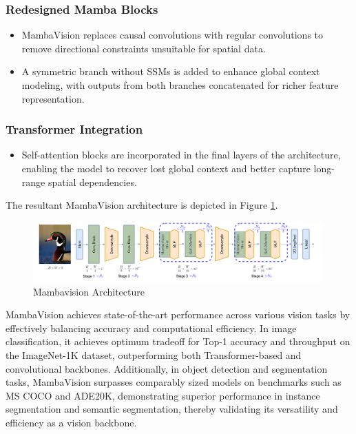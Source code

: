 \documentclass[12pt, conference, compsoc, onecolumn]{IEEEtran}
\begin{document}
	\subsubsection*{Redesigned Mamba Blocks}
	\begin{itemize}
		\item MambaVision replaces causal convolutions with regular convolutions to remove directional constraints unsuitable for spatial data.
		\item A symmetric branch without SSMs is added to enhance global context modeling, with outputs from both branches concatenated for richer feature representation.
	\end{itemize}
	
	\subsubsection*{Transformer Integration}
	\begin{itemize}
		\item Self-attention blocks are incorporated in the final layers of the architecture, enabling the model to recover lost global context and better capture long-range spatial dependencies.
	\end{itemize}
	
	
	The resultant MambaVision architecture is depicted in Figure \ref{fig:mambavision_arch}.

	\begin{figure}[H]
		\centering
		\includegraphics[width=0.99\textwidth]{figures/mambavision_arch.png}
		\caption{Mambavision Architecture\cite{hatamizadeh2024mambavision}}
		\label{fig:mambavision_arch}
	\end{figure}
	
	MambaVision achieves state-of-the-art performance across various vision tasks by effectively balancing accuracy and computational efficiency. In image classification, it achieves optimum tradeoff for Top-1 accuracy and throughput on the ImageNet-1K dataset, outperforming both Transformer-based and convolutional backbones. Additionally, in object detection and segmentation tasks, MambaVision surpasses comparably sized models on benchmarks such as MS COCO and ADE20K, demonstrating superior performance in instance segmentation and semantic segmentation, thereby validating its versatility and efficiency as a vision backbone.
	
\end{document}
